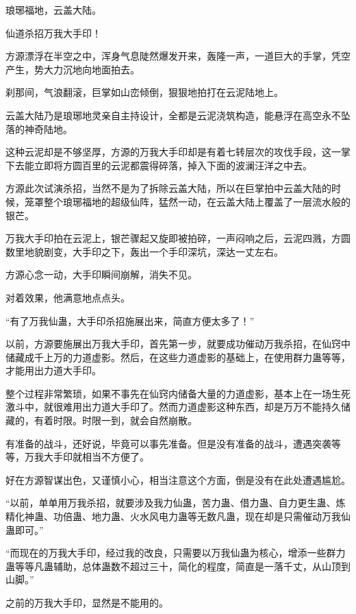 
\begin{this_body}

琅琊福地，云盖大陆。

仙道杀招万我大手印！

方源漂浮在半空之中，浑身气息陡然爆发开来，轰隆一声，一道巨大的手掌，凭空产生，势大力沉地向地面拍去。

刹那间，气浪翻滚，巨掌如山峦倾倒，狠狠地拍打在云泥陆地上。

云盖大陆乃是琅琊地灵亲自主持设计，全都是云泥浇筑构造，能悬浮在高空永不坠落的神奇陆地。

这种云泥却是不够坚厚，方源的万我大手印却是有着七转层次的攻伐手段，这一掌下去能立即将方圆百里的云泥都震得碎落，掉入下面的波澜汪洋之中去。

方源此次试演杀招，当然不是为了拆除云盖大陆，所以在巨掌拍中云盖大陆的时候，笼罩整个琅琊福地的超级仙阵，猛然一动，在云盖大陆上覆盖了一层流水般的银芒。

万我大手印拍在云泥上，银芒骤起又旋即被拍碎，一声闷响之后，云泥四溅，方圆数里地貌剧变，大手印之下，轰出一个手印深坑，深达一丈左右。

方源心念一动，大手印瞬间崩解，消失不见。

对着效果，他满意地点点头。

“有了万我仙蛊，大手印杀招施展出来，简直方便太多了！”

以前，方源要施展出万我大手印，首先第一步，就要成功催动万我杀招，在仙窍中储藏成千上万的力道虚影。然后，在这些力道虚影的基础上，在使用群力蛊等等，才能用出力道大手印。

整个过程非常繁琐，如果不事先在仙窍内储备大量的力道虚影，基本上在一场生死激斗中，就很难用出力道大手印了。然而力道虚影这种东西，却是万万不能持久储藏的，有着时限。时限一到，就会自然崩散。

有准备的战斗，还好说，毕竟可以事先准备。但是没有准备的战斗，遭遇突袭等等，万我大手印就相当不方便了。

好在方源智谋出色，又谨慎小心，相当注意这个方面，倒是没有在此处遭遇尴尬。

“以前，单单用万我杀招，就要涉及我力仙蛊，苦力蛊、借力蛊、自力更生蛊、炼精化神蛊、功倍蛊、地力蛊、火水风电力蛊等无数凡蛊，现在却是只需催动万我仙蛊即可。”

“而现在的万我大手印，经过我的改良，只需要以万我仙蛊为核心，增添一些群力蛊等等凡蛊辅助，总体蛊数不超过三十，简化的程度，简直是一落千丈，从山顶到山脚。”

之前的万我大手印，显然是不能用的。


\end{this_body}
